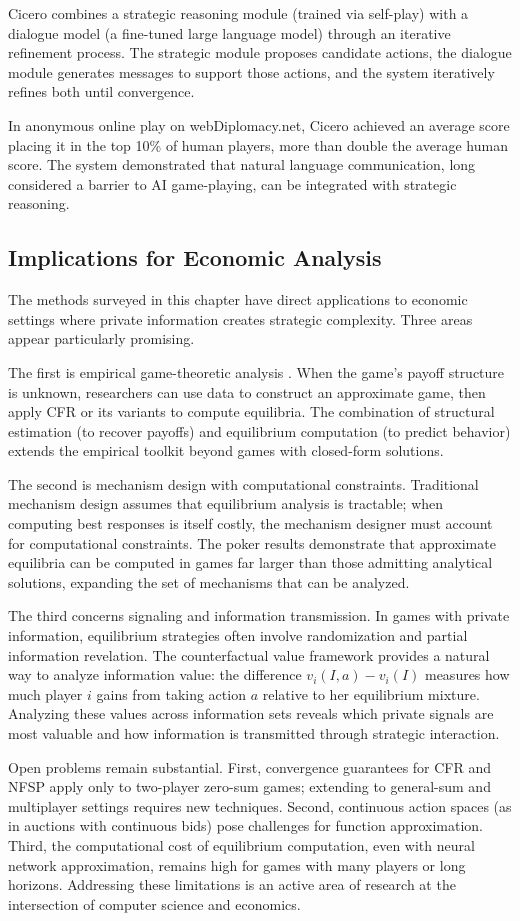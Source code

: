 Cicero combines a strategic reasoning module (trained via self-play) with a dialogue model (a fine-tuned large language model) through an iterative refinement process. The strategic module proposes candidate actions, the dialogue module generates messages to support those actions, and the system iteratively refines both until convergence.

In anonymous online play on webDiplomacy.net, Cicero achieved an average score placing it in the top 10\% of human players, more than double the average human score. The system demonstrated that natural language communication, long considered a barrier to AI game-playing, can be integrated with strategic reasoning.

\subsection{Implications for Economic Analysis}

The methods surveyed in this chapter have direct applications to economic settings where private information creates strategic complexity. Three areas appear particularly promising.

The first is empirical game-theoretic analysis \citep{wellman2006methods}. When the game's payoff structure is unknown, researchers can use data to construct an approximate game, then apply CFR or its variants to compute equilibria. The combination of structural estimation (to recover payoffs) and equilibrium computation (to predict behavior) extends the empirical toolkit beyond games with closed-form solutions.

The second is mechanism design with computational constraints. Traditional mechanism design assumes that equilibrium analysis is tractable; when computing best responses is itself costly, the mechanism designer must account for computational constraints. The poker results demonstrate that approximate equilibria can be computed in games far larger than those admitting analytical solutions, expanding the set of mechanisms that can be analyzed.

The third concerns signaling and information transmission. In games with private information, equilibrium strategies often involve randomization and partial information revelation. The counterfactual value framework provides a natural way to analyze information value: the difference $v_i(I, a) - v_i(I)$ measures how much player $i$ gains from taking action $a$ relative to her equilibrium mixture. Analyzing these values across information sets reveals which private signals are most valuable and how information is transmitted through strategic interaction.

Open problems remain substantial. First, convergence guarantees for CFR and NFSP apply only to two-player zero-sum games; extending to general-sum and multiplayer settings requires new techniques. Second, continuous action spaces (as in auctions with continuous bids) pose challenges for function approximation. Third, the computational cost of equilibrium computation, even with neural network approximation, remains high for games with many players or long horizons. Addressing these limitations is an active area of research at the intersection of computer science and economics.
